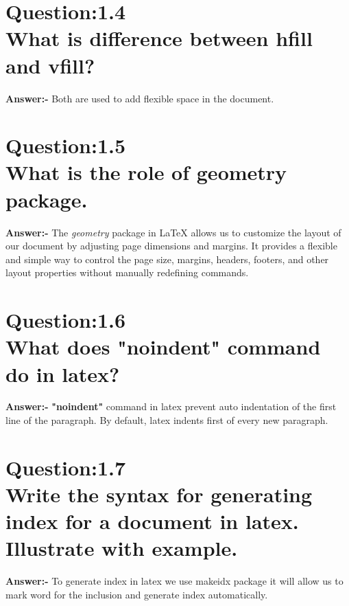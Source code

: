 \section*{Question:1.4 \\ What is difference between hfill and vfill?}
\textbf{Answer:-} Both are used to add flexible space in the document.

\begin{table}[h!]
\centering
{}
\caption{Difference between hfill and vfill}
\end{table}

\section*{Question:1.5 \\ What is the role of geometry package.}
\textbf{Answer:-} The \textit{geometry} package in LaTeX allows us to customize the layout of our document by adjusting page dimensions and margins. It provides a flexible and simple way to control the page size, margins, headers, footers, and other layout properties without manually redefining commands.

\section*{Question:1.6 \\ What does \textbf{"noindent"} command do in latex?}
\textbf{Answer:-} \textbf{"noindent"} command in latex prevent auto indentation of the first line of the paragraph.
By default, latex indents first of every new paragraph.

\section*{Question:1.7 \\ Write the syntax for generating index for a document in latex. Illustrate with example.}
\textbf{Answer:-} To generate index in latex we use makeidx package it will allow us to mark word for the inclusion and generate index automatically.

